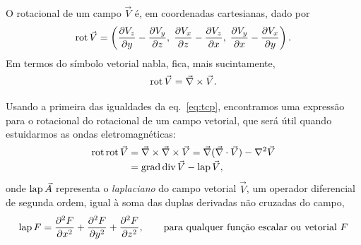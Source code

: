 O rotacional de um campo $\vec V$ é, em coordenadas cartesianas, dado por
\begin{equation}\label{eq:rotcart}
  \rot\vec V=
  \left(\pd{V_z}{y}-\pd{V_y}{z},\; \pd{V_x}{z}-\pd{V_z}{x},\;
  \pd{V_y}{x}-\pd{V_x}{y}\right).
\end{equation}
Em termos do símbolo vetorial nabla, fica, mais sucintamente,
\begin{equation}
  \rot\vec V=\vec\nabla\times\vec V.
\end{equation}

Usando a primeira das igualdades da eq.~\eqref{eq:tcp}, encontramos uma
expressão para o rotacional do rotacional de um campo vetorial, que será útil
quando estuidarmos as ondas eletromagnéticas:
\begin{align}
\rot\rot \vec V&=\vec\nabla\times\vec\nabla\times\vec V=
\vec \nabla(\vec\nabla\cdot\vec V)-\nabla^2\vec V\nonumber\\
&=\grad\div \vec V-\lap\vec V,
\end{align}
onde $\lap\vec A$ representa o \emph{laplaciano} do campo vetorial $\vec V$, um
operador diferencial de segunda ordem, igual à soma das duplas derivadas não
cruzadas do campo,
\begin{equation}
\text{lap}\, F =
\frac{\partial^2 F}{\partial x^2}+
\frac{\partial^2 F}{\partial y^2}+
\frac{\partial^2 F}{\partial z^2},\qquad\text{para qualquer função escalar ou vetorial $F$}
\end{equation}
